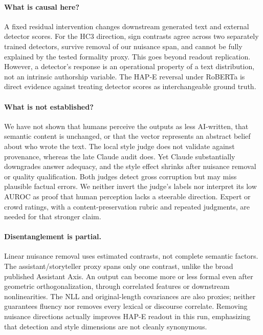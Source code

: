 \paragraph{What is causal here?} A fixed residual intervention changes downstream generated text and external detector scores. For the HC3 direction, sign contrasts agree across two separately trained detectors, survive removal of our nuisance span, and cannot be fully explained by the tested formality proxy. This goes beyond readout replication. However, a detector's response is an operational property of a text distribution, not an intrinsic authorship variable. The HAP-E reversal under RoBERTa is direct evidence against treating detector scores as interchangeable ground truth.

\paragraph{What is not established?} We have not shown that humans perceive the outputs as less AI-written, that semantic content is unchanged, or that the vector represents an abstract belief about who wrote the text. The local style judge does not validate against provenance, whereas the late Claude audit does. Yet Claude substantially downgrades answer adequacy, and the style effect shrinks after nuisance removal or quality qualification. Both judges detect gross corruption but may miss plausible factual errors. We neither invert the judge's labels nor interpret its low AUROC as proof that human perception lacks a steerable direction. Expert or crowd ratings, with a content-preservation rubric and repeated judgments, are needed for that stronger claim.

\paragraph{Disentanglement is partial.} Linear nuisance removal uses estimated contrasts, not complete semantic factors. The assistant/storyteller proxy spans only one contrast, unlike the broad published Assistant Axis. An output can become more or less formal even after geometric orthogonalization, through correlated features or downstream nonlinearities. The NLL and original-length covariances are also proxies; neither guarantees fluency nor removes every lexical or discourse correlate. Removing nuisance directions actually improves HAP-E readout in this run, emphasizing that detection and style dimensions are not cleanly synonymous.

